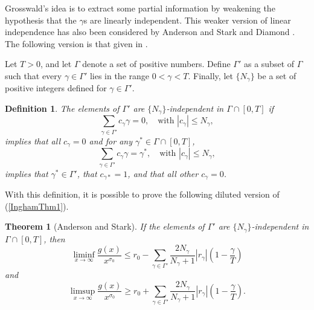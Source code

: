 \documentclass{article}
\newtheorem{theorem}{Theorem}
\newtheorem{defn}{Definition}
\numberwithin{equation}{section}
\begin{document}
Grosswald's idea is to extract some partial information by weakening the hypothesis that the $\gamma$s are linearly independent. This weaker version of linear independence has also been considered by Anderson and Stark \cite{AndStark} and Diamond \cite{Diamond}. The following version is that given in \cite{AndStark}.

Let $T>0$, and let $\Gamma$ denote a set of positive numbers. Define $\Gamma'$ as a subset of $\Gamma$ such that every $\gamma\in\Gamma'$ lies in the range $0< \gamma< T$. Finally, let $\{N_{\gamma}\}$ be a set of positive integers defined for $\gamma \in \Gamma'$.

\begin{defn}\label{defcon1}
The elements of $\Gamma'$ are $\{N_{\gamma}\}$-independent in $\Gamma \cap [0, T]$ if
\begin{equation}\label{ind1}
\sum_{\gamma\in\Gamma'} c_{\gamma} \gamma = 0, \quad \textrm{with } |c_{\gamma}| \leq N_{\gamma},
\end{equation}
implies that all $c_{\gamma} = 0$ and for any $\gamma^{*}\in \Gamma \cap [0, T]$,
\begin{equation}\label{ind2}
\sum_{\gamma\in\Gamma'} c_{\gamma} \gamma = \gamma^{*}, \quad \textrm{with } |c_{\gamma}| \leq N_{\gamma},
\end{equation}
implies that $\gamma^{*} \in \Gamma'$, that $c_{\gamma*} = 1$, and that all other $c_{\gamma} = 0$.
\end{defn}


With this definition, it is possible to prove the following diluted version of (\ref{InghamThm1}).
\begin{theorem}[Anderson and Stark]\label{AndThm}
If the elements of $\Gamma'$ are $\{N_{\gamma}\}$-independent in $\Gamma \cap[0,T]$, then
\begin{equation}\label{AndS1}
\liminf_{x\rightarrow\infty} \frac{g(x)}{x^{\sigma_{0}}} \leq r_{0} - \sum_{\gamma \in \Gamma'} \frac{2N_{\gamma}}{N_{\gamma} + 1} |r_{\gamma}| \left(1- \frac{\gamma}{T}\right)
\end{equation}
and
\begin{equation}\label{AndS2}
\limsup_{x\rightarrow\infty} \frac{g(x)}{x^{\sigma_{0}}} \geq r_{0} + \sum_{\gamma \in \Gamma'} \frac{2N_{\gamma}}{N_{\gamma} + 1} |r_{\gamma}| \left(1- \frac{\gamma}{T}\right).
\end{equation}
\end{theorem}
\end{document}
